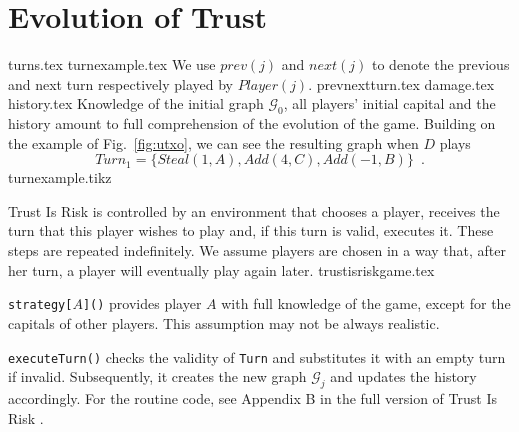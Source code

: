 \section{Evolution of Trust}
  {turns.tex}
  \ifdefined\proceedings
  \else
    {turnexample.tex}
    We use $prev\left(j\right)$ and $next\left(j\right)$ to denote the previous and next turn respectively played by
    $Player(j)$.
  \fi
  {prevnextturn.tex}
  {damage.tex}
  {history.tex}
  \noindent Knowledge of the initial graph $\mathcal{G}_0$, all players' initial capital and the history amount to full
  comprehension of the evolution of the game. Building on the example of Fig.~\ref{fig:utxo}, we can see the resulting graph
  when $D$ plays
  \begin{equation}
  \label{turnexample}
     Turn_1 = \{Steal\left(1, A\right), Add\left(4, C\right), Add\left(-1, B\right)\} \enspace.
  \end{equation}
  {turnexample.tikz}

  \noindent Trust Is Risk is controlled by an environment that chooses a player, receives the turn that this player wishes to
  play and, if this turn is valid, executes it. These steps are repeated indefinitely. We assume players are chosen in a way
  that, after her turn, a player will eventually play again later.
  {trustisriskgame.tex}

  \noindent \texttt{strategy[}$A$\texttt{]()} provides player $A$ with full knowledge of the game, except for the capitals of
  other players. This assumption may not be always realistic.

  \texttt{executeTurn()} checks the validity of \texttt{Turn} and substitutes it with an empty turn if invalid.
  Subsequently, it creates the new graph $\mathcal{G}_j$ and updates the history accordingly. For the routine code,
  see Appendix B in the full version of Trust Is Risk \cite{trustisrisk}.
